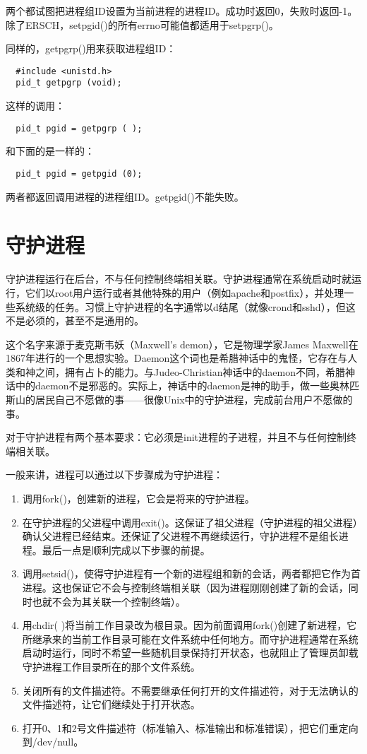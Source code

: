 两个都试图把进程组ID设置为当前进程的进程ID。成功时返回0，失败时返回-1。除了ERSCH，setpgid()的所有errno可能值都适用于setpgrp()。

同样的，getpgrp()用来获取进程组ID：

\begin{lstlisting}
  #include <unistd.h>
  pid_t getpgrp (void);
\end{lstlisting}

这样的调用：

\begin{lstlisting}
  pid_t pgid = getpgrp ( );
\end{lstlisting}

和下面的是一样的：
\begin{lstlisting}
  pid_t pgid = getpgid (0);
\end{lstlisting}

两者都返回调用进程的进程组ID。getpgid()不能失败。

\section{守护进程}

守护进程运行在后台，不与任何控制终端相关联。守护进程通常在系统启动时就运行，它们以root用户运行或者其他特殊的用户（例如apache和postfix），并处理一些系统级的任务。习惯上守护进程的名字通常以d结尾（就像crond和sshd），但这不是必须的，甚至不是通用的。

这个名字来源于麦克斯韦妖（Maxwell’s demon），它是物理学家James Maxwell在1867年进行的一个思想实验。Daemon这个词也是希腊神话中的鬼怪，它存在与人类和神之间，拥有占卜的能力。与Judeo-Christian神话中的daemon不同，希腊神话中的daemon不是邪恶的。实际上，神话中的daemon是神的助手，做一些奥林匹斯山的居民自己不愿做的事——很像Unix中的守护进程，完成前台用户不愿做的事。

对于守护进程有两个基本要求：它必须是init进程的子进程，并且不与任何控制终端相关联。

一般来讲，进程可以通过以下步骤成为守护进程：

\begin{enumerate}
\item 调用fork()，创建新的进程，它会是将来的守护进程。
\item 在守护进程的父进程中调用exit()。这保证了祖父进程（守护进程的祖父进程）确认父进程已经结束。还保证了父进程不再继续运行，守护进程不是组长进程。最后一点是顺利完成以下步骤的前提。
\item 调用setsid()，使得守护进程有一个新的进程组和新的会话，两者都把它作为首进程。这也保证它不会与控制终端相关联（因为进程刚刚创建了新的会话，同时也就不会为其关联一个控制终端）。
\item 用chdir( )将当前工作目录改为根目录。因为前面调用fork()创建了新进程，它所继承来的当前工作目录可能在文件系统中任何地方。而守护进程通常在系统启动时运行，同时不希望一些随机目录保持打开状态，也就阻止了管理员卸载守护进程工作目录所在的那个文件系统。
\item 关闭所有的文件描述符。不需要继承任何打开的文件描述符，对于无法确认的文件描述符，让它们继续处于打开状态。
\item 打开0、1和2号文件描述符（标准输入、标准输出和标准错误），把它们重定向到/dev/null。
\end{enumerate}

